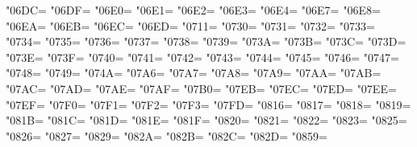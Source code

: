 \XeTeXcharclass"06DC=\KclassCM
\XeTeXcharclass"06DF=\KclassCM
\XeTeXcharclass"06E0=\KclassCM
\XeTeXcharclass"06E1=\KclassCM
\XeTeXcharclass"06E2=\KclassCM
\XeTeXcharclass"06E3=\KclassCM
\XeTeXcharclass"06E4=\KclassCM
\XeTeXcharclass"06E7=\KclassCM
\XeTeXcharclass"06E8=\KclassCM
\XeTeXcharclass"06EA=\KclassCM
\XeTeXcharclass"06EB=\KclassCM
\XeTeXcharclass"06EC=\KclassCM
\XeTeXcharclass"06ED=\KclassCM
\XeTeXcharclass"0711=\KclassCM
\XeTeXcharclass"0730=\KclassCM
\XeTeXcharclass"0731=\KclassCM
\XeTeXcharclass"0732=\KclassCM
\XeTeXcharclass"0733=\KclassCM
\XeTeXcharclass"0734=\KclassCM
\XeTeXcharclass"0735=\KclassCM
\XeTeXcharclass"0736=\KclassCM
\XeTeXcharclass"0737=\KclassCM
\XeTeXcharclass"0738=\KclassCM
\XeTeXcharclass"0739=\KclassCM
\XeTeXcharclass"073A=\KclassCM
\XeTeXcharclass"073B=\KclassCM
\XeTeXcharclass"073C=\KclassCM
\XeTeXcharclass"073D=\KclassCM
\XeTeXcharclass"073E=\KclassCM
\XeTeXcharclass"073F=\KclassCM
\XeTeXcharclass"0740=\KclassCM
\XeTeXcharclass"0741=\KclassCM
\XeTeXcharclass"0742=\KclassCM
\XeTeXcharclass"0743=\KclassCM
\XeTeXcharclass"0744=\KclassCM
\XeTeXcharclass"0745=\KclassCM
\XeTeXcharclass"0746=\KclassCM
\XeTeXcharclass"0747=\KclassCM
\XeTeXcharclass"0748=\KclassCM
\XeTeXcharclass"0749=\KclassCM
\XeTeXcharclass"074A=\KclassCM
\XeTeXcharclass"07A6=\KclassCM
\XeTeXcharclass"07A7=\KclassCM
\XeTeXcharclass"07A8=\KclassCM
\XeTeXcharclass"07A9=\KclassCM
\XeTeXcharclass"07AA=\KclassCM
\XeTeXcharclass"07AB=\KclassCM
\XeTeXcharclass"07AC=\KclassCM
\XeTeXcharclass"07AD=\KclassCM
\XeTeXcharclass"07AE=\KclassCM
\XeTeXcharclass"07AF=\KclassCM
\XeTeXcharclass"07B0=\KclassCM
\XeTeXcharclass"07EB=\KclassCM
\XeTeXcharclass"07EC=\KclassCM
\XeTeXcharclass"07ED=\KclassCM
\XeTeXcharclass"07EE=\KclassCM
\XeTeXcharclass"07EF=\KclassCM
\XeTeXcharclass"07F0=\KclassCM
\XeTeXcharclass"07F1=\KclassCM
\XeTeXcharclass"07F2=\KclassCM
\XeTeXcharclass"07F3=\KclassCM
\XeTeXcharclass"07FD=\KclassCM
\XeTeXcharclass"0816=\KclassCM
\XeTeXcharclass"0817=\KclassCM
\XeTeXcharclass"0818=\KclassCM
\XeTeXcharclass"0819=\KclassCM
\XeTeXcharclass"081B=\KclassCM
\XeTeXcharclass"081C=\KclassCM
\XeTeXcharclass"081D=\KclassCM
\XeTeXcharclass"081E=\KclassCM
\XeTeXcharclass"081F=\KclassCM
\XeTeXcharclass"0820=\KclassCM
\XeTeXcharclass"0821=\KclassCM
\XeTeXcharclass"0822=\KclassCM
\XeTeXcharclass"0823=\KclassCM
\XeTeXcharclass"0825=\KclassCM
\XeTeXcharclass"0826=\KclassCM
\XeTeXcharclass"0827=\KclassCM
\XeTeXcharclass"0829=\KclassCM
\XeTeXcharclass"082A=\KclassCM
\XeTeXcharclass"082B=\KclassCM
\XeTeXcharclass"082C=\KclassCM
\XeTeXcharclass"082D=\KclassCM
\XeTeXcharclass"0859=\KclassCM

